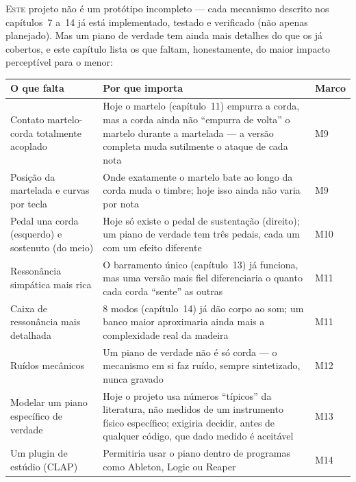 \documentclass[11pt,oneside]{book}
\newcommand{\opening}[2]{\lettrine[lines=2,loversize=0.08,lraise=0.02]{#1}{#2}}
\begin{document}
\opening{E}{ste} projeto não é um protótipo incompleto --- cada mecanismo
descrito nos capítulos~7 a~14 já está implementado, testado e verificado
(não apenas planejado). Mas um piano de verdade tem ainda mais detalhes do
que os já cobertos, e este capítulo lista os que faltam, honestamente, do
maior impacto perceptível para o menor:

\begin{table}[h!]
\centering
\small
\begin{tabularx}{\linewidth}{p{3.6cm}Xl}
\toprule
\textbf{O que falta} & \textbf{Por que importa} & \textbf{Marco} \\
\midrule
Contato martelo-corda totalmente acoplado &
Hoje o martelo (capítulo~11) empurra a corda, mas a corda ainda não
\enquote{empurra de volta} o martelo durante a martelada --- a versão
completa muda sutilmente o ataque de cada nota & M9 \\
\addlinespace
Posição da martelada e curvas por tecla &
Onde exatamente o martelo bate ao longo da corda muda o timbre; hoje isso
ainda não varia por nota & M9 \\
\addlinespace
Pedal una corda (esquerdo) e sostenuto (do meio) &
Hoje só existe o pedal de sustentação (direito); um piano de verdade tem
três pedais, cada um com um efeito diferente & M10 \\
\addlinespace
Ressonância simpática mais rica &
O barramento único (capítulo~13) já funciona, mas uma versão mais fiel
diferenciaria o quanto cada corda \enquote{sente} as outras & M11 \\
\addlinespace
Caixa de ressonância mais detalhada &
8 modos (capítulo~14) já dão corpo ao som; um banco maior aproximaria
ainda mais a complexidade real da madeira & M11 \\
\addlinespace
Ruídos mecânicos &
Um piano de verdade não é só corda --- o mecanismo em si faz ruído, sempre
sintetizado, nunca gravado & M12 \\
\addlinespace
Modelar um piano específico de verdade &
Hoje o projeto usa números \enquote{típicos} da literatura, não medidos de
um instrumento físico específico; exigiria decidir, antes de qualquer
código, que dado medido é aceitável & M13 \\
\addlinespace
Um plugin de estúdio (CLAP) &
Permitiria usar o piano dentro de programas como Ableton, Logic ou Reaper
& M14 \\
\bottomrule
\end{tabularx}
\end{table}
\end{document}
